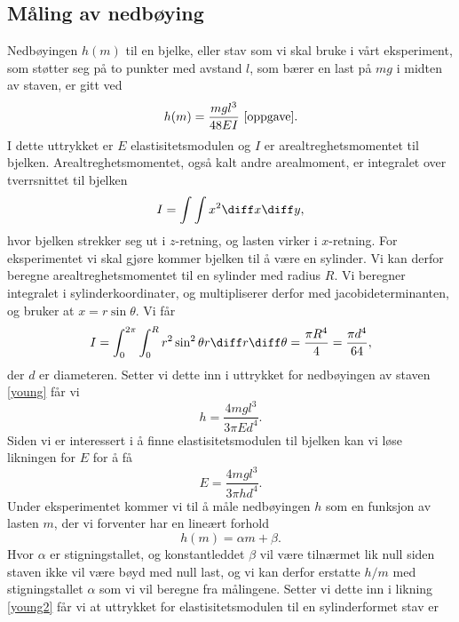 \documentclass[%
 reprint,
nofootinbib,
aps,
]{revtex4-1}
\begin{document}
\subsection{Måling av nedbøying}
Nedbøyingen $h(m)$ til en bjelke, eller stav som vi skal bruke i vårt eksperiment, som støtter seg på to punkter med avstand $l$, som bærer en last på $mg$ i midten av staven, er gitt ved
\begin{equation}
  h(m) = \frac{mgl^3}{48EI} \,\,\label{young} \cite{oppgave}.
\end{equation}
I dette uttrykket er $E$ elastisitetsmodulen og $I$ er arealtreghetsmomentet til bjelken. Arealtreghetsmomentet, også kalt andre arealmoment, er integralet over tverrsnittet til bjelken
\begin{equation*}
  I = \int\int x^2 \diff x \diff y,
\end{equation*}hvor bjelken strekker seg ut i $z$-retning, og lasten virker i $x$-retning. For eksperimentet vi skal gjøre kommer bjelken til å være en sylinder. Vi kan derfor beregne arealtreghetsmomentet til en sylinder med radius $R$. Vi beregner integralet i sylinderkoordinater, og multipliserer derfor med jacobideterminanten, og bruker at $x = r\sin{\theta}$. Vi får
\begin{equation*}
  I = \int_0^{2\pi} \int_0^R r^2\sin^2{\theta}r \diff r \diff \theta = \frac{\pi R^4}{4} = \frac{\pi d^4}{64},
\end{equation*}
der $d$ er diameteren. Setter vi dette inn i  uttrykket for nedbøyingen av staven \eqref{young} får vi
\begin{equation*}
  h = \frac{4mgl^3}{3\pi Ed^4}.
\end{equation*}
Siden vi er interessert i å finne elastisitetsmodulen til bjelken kan vi løse likningen for $E$ for å få
\begin{equation}
  E = \frac{4mgl^3}{3\pi hd^4}. \label{young2}
\end{equation}
Under eksperimentet kommer vi til å måle nedbøyingen $h$ som en funksjon av lasten $m$, der vi forventer har en lineært forhold
\begin{equation*}
  h(m) = \alpha m + \beta.
\end{equation*}
Hvor $\alpha$ er stigningstallet, og konstantleddet $\beta$ vil være tilnærmet lik null siden staven ikke vil være bøyd med null last, og vi kan derfor erstatte $h/m$ med stigningstallet $\alpha$ som vi vil beregne fra målingene. Setter vi dette inn i likning \eqref{young2} får vi at uttrykket for elastisitetsmodulen til en sylinderformet stav er
\end{document}

